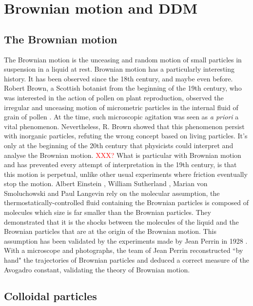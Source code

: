 \documentclass[%
 aip,
 jmp,%
 amsmath,amssymb,
reprint,%
]{revtex4-1}
\begin{document}
\section{Brownian motion and DDM}
\label{sec:BrownSection}

\subsection{The Brownian motion}

The Brownian motion is the unceasing and random motion of small particles in suspension in a liquid at rest. Brownian motion has a particularly interesting history. It has been observed since the 18th century, and maybe even before. Robert Brown, a Scottish botanist from the beginning of the 19th century, who was interested in the action of pollen on plant reproduction, observed the irregular and unceasing motion of micrometric particles in the internal fluid of grain of pollen \citep{13_brown1828brief}. At the time, such microscopic agitation was seen as \textit{a priori} a vital phenomenon. Nevertheless, R. Brown showed that this phenomenon persist with inorganic particles, refuting the wrong concept based on living particles. It's only at the beginning of the 20th century that physicists could interpret and analyse the Brownian motion. \textcolor{red}{XXX?} What is particular with Brownian motion and has prevented every attempt of interpretation in the 19th century, is that this motion is perpetual, unlike other usual experiments where friction eventually stop the motion. Albert Einstein \citep{9_einstein1906theory}, William Sutherland \citep{14_sutherland1905lxxv}, Marian von Smoluchowski \citep{10_von1906kinetischen} and Paul Langevin \citep{15_Langevin} rely on the molecular assumption, the thermostatically-controlled fluid containing the Brownian particles is composed of molecules which size is far smaller than the Brownian particles. They demonstrated that it is the shocks between the molecules of the liquid and the Brownian particles that are at the origin of the Brownian motion. This assumption has been validated by the experiments made by Jean Perrin in 1928 \citep{22_perrin2014atomes}. With a microscope and photographs, the team of Jean Perrin reconstructed ``by hand" the trajectories of Brownian particles and deduced a correct measure of the Avogadro constant, validating the theory of Brownian motion.

\subsection{Colloidal particles}
\end{document}
